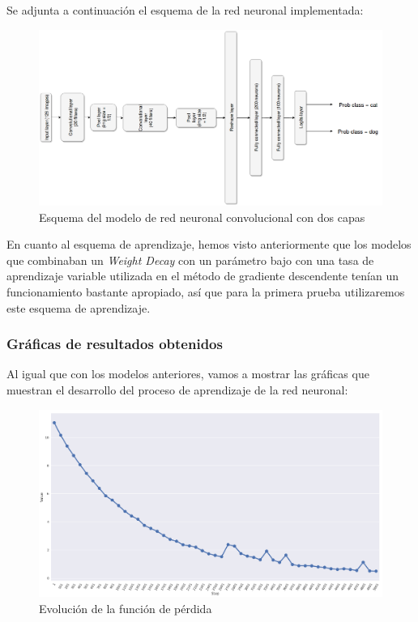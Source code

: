 \documentclass[11pt]{article}
\theoremstyle{plain}
\theoremstyle{definition}
\begin{document}
Se adjunta a continuación el esquema de la red neuronal implementada:

\begin{figure}[H]
  \centering
  \includegraphics[width=.7\textwidth]{imgs/2conv_model.png}
  \caption{Esquema del modelo de red neuronal convolucional con dos
    capas}
\end{figure}

En cuanto al esquema de aprendizaje, hemos visto anteriormente que los
modelos que combinaban un \textit{Weight Decay} con un parámetro
bajo con una tasa de aprendizaje variable utilizada en el método de
gradiente descendente tenían un funcionamiento bastante apropiado, así
que para la primera prueba utilizaremos este esquema de aprendizaje.

\subsubsection{Gráficas de resultados obtenidos}

Al igual que con los modelos anteriores, vamos a mostrar las gráficas
que muestran el desarrollo del proceso de aprendizaje de la red
neuronal:

\begin{figure}[H]
  \centering \includegraphics[width=.95\textwidth]{imgs/loss_2conv}
  \caption{Evolución de la función de pérdida}
\end{figure}
\end{document}
